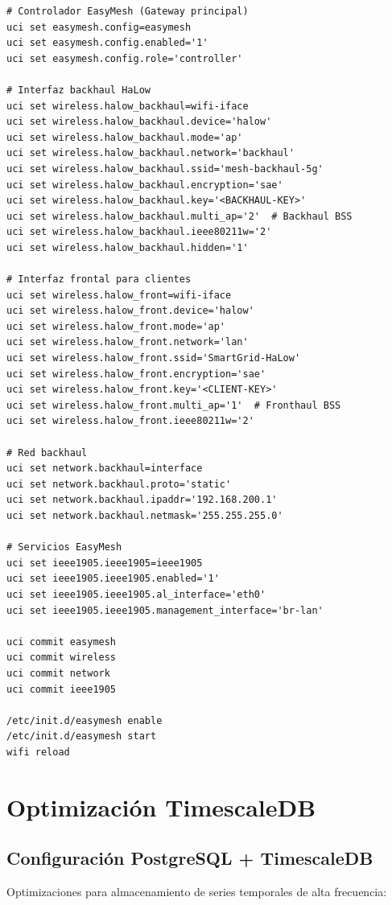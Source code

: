 \begin{verbatim}
# Controlador EasyMesh (Gateway principal)
uci set easymesh.config=easymesh
uci set easymesh.config.enabled='1'
uci set easymesh.config.role='controller'

# Interfaz backhaul HaLow
uci set wireless.halow_backhaul=wifi-iface
uci set wireless.halow_backhaul.device='halow'
uci set wireless.halow_backhaul.mode='ap'
uci set wireless.halow_backhaul.network='backhaul'
uci set wireless.halow_backhaul.ssid='mesh-backhaul-5g'
uci set wireless.halow_backhaul.encryption='sae'
uci set wireless.halow_backhaul.key='<BACKHAUL-KEY>'
uci set wireless.halow_backhaul.multi_ap='2'  # Backhaul BSS
uci set wireless.halow_backhaul.ieee80211w='2'
uci set wireless.halow_backhaul.hidden='1'

# Interfaz frontal para clientes
uci set wireless.halow_front=wifi-iface
uci set wireless.halow_front.device='halow'
uci set wireless.halow_front.mode='ap'
uci set wireless.halow_front.network='lan'
uci set wireless.halow_front.ssid='SmartGrid-HaLow'
uci set wireless.halow_front.encryption='sae'
uci set wireless.halow_front.key='<CLIENT-KEY>'
uci set wireless.halow_front.multi_ap='1'  # Fronthaul BSS
uci set wireless.halow_front.ieee80211w='2'

# Red backhaul
uci set network.backhaul=interface
uci set network.backhaul.proto='static'
uci set network.backhaul.ipaddr='192.168.200.1'
uci set network.backhaul.netmask='255.255.255.0'

# Servicios EasyMesh
uci set ieee1905.ieee1905=ieee1905
uci set ieee1905.ieee1905.enabled='1'
uci set ieee1905.ieee1905.al_interface='eth0'
uci set ieee1905.ieee1905.management_interface='br-lan'

uci commit easymesh
uci commit wireless
uci commit network
uci commit ieee1905

/etc/init.d/easymesh enable
/etc/init.d/easymesh start
wifi reload
\end{verbatim}

\section{Optimización TimescaleDB}

\subsection{Configuración PostgreSQL + TimescaleDB}

Optimizaciones para almacenamiento de series temporales de alta frecuencia:

